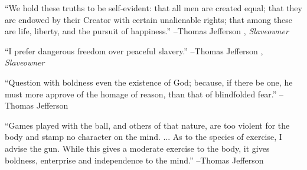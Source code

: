 \documentclass{article}%
\begin{document}
\linebreak%
\vspace{1mm}%
\begin{minipage}{\textwidth}%
\flushleft%
“We hold these truths to be self{-}evident: that all men are created equal; that they are endowed by their Creator with certain unalienable rights; that among these are life, liberty, and the pursuit of happiness.”%
\linebreak%
\vspace{1mm}%
–Thomas Jefferson%
, \textit{Slaveowner}%
\linebreak%
\vspace{1mm}%
\end{minipage}%
\linebreak%
\vspace{1mm}%
\begin{minipage}{\textwidth}%
\flushleft%
“I prefer dangerous freedom over peaceful slavery.”%
\linebreak%
\vspace{1mm}%
–Thomas Jefferson%
, \textit{Slaveowner}%
\linebreak%
\vspace{1mm}%
\end{minipage}%
\linebreak%
\vspace{1mm}%
\begin{minipage}{\textwidth}%
\flushleft%
“Question with boldness even the existence of God; because, if there be one, he must more approve of the homage of reason, than that of blindfolded fear.”%
\linebreak%
\vspace{1mm}%
–Thomas Jefferson%
\linebreak%
\vspace{1mm}%
\end{minipage}%
\linebreak%
\vspace{1mm}%
\begin{minipage}{\textwidth}%
\flushleft%
“Games played with the ball, and others of that nature, are too violent for the body and stamp no character on the mind. ... As to the species of exercise, I advise the gun. While this gives a moderate exercise to the body, it gives boldness, enterprise and independence to the mind.”%
\linebreak%
\vspace{1mm}%
–Thomas Jefferson%
\linebreak%
\vspace{1mm}%
\end{minipage}%
\end{document}
